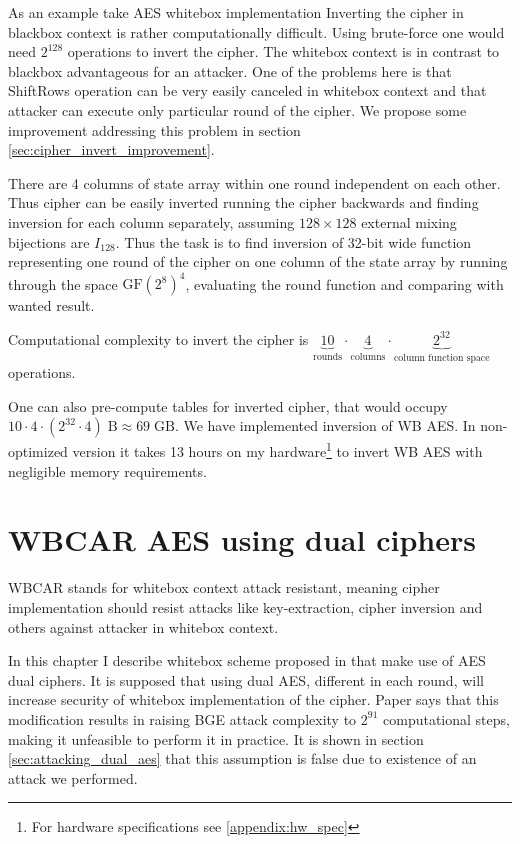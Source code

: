 \documentclass[11pt,oneside,final]{fithesis2}
\begin{document}
    As an example take AES whitebox implementation
    Inverting the cipher in blackbox context is rather computationally difficult. Using brute-force one would
    need $2^{128}$ operations to invert the cipher. The whitebox context is in contrast to blackbox advantageous for an attacker. One of the problems here is 
    that ShiftRows operation can be very easily canceled in whitebox context and that attacker can execute only particular round of the cipher. 
    We propose some improvement addressing this problem in section \ref{sec:cipher_invert_improvement}.

    There are 4 columns of state array within one round independent on each other.
    Thus cipher can be easily inverted running the cipher backwards and finding inversion for each column separately, assuming $128\times128$ external mixing bijections
    are $I_{128}$. Thus the task is to find 
    inversion of 32-bit wide function representing one round of the cipher on one column of the state array by running through the space $\text{GF}\left(2^8\right)^4$,
    evaluating the round function and comparing with wanted result.
    
    Computational complexity to invert the cipher
    is $\underbrace{10}_\text{rounds} \cdot \underbrace{4}_\text{columns} \cdot \underbrace{2^{32}}_\text{column function space}$ operations.
    
    One can also pre-compute tables for inverted cipher, that would occupy $10 \cdot 4 \cdot (2^{32} \cdot 4)\;\text{B} \approx 69\;\text{GB}$.
    We have implemented inversion of WB AES. In non-optimized version it takes 13 hours on my hardware\footnote{For hardware specifications see \ref{appendix:hw_spec}} 
    to invert WB AES with negligible memory requirements.

\chapter{WBCAR AES using dual ciphers}
    WBCAR stands for whitebox context attack resistant, meaning cipher implementation should resist attacks like key-extraction, cipher inversion
    and others against attacker in whitebox context.
    
    In this chapter I describe whitebox scheme proposed in \citep{Karroumi:2010:PWA:2041036.2041060} that make use of AES dual ciphers. It is supposed 
    that using dual AES, different in each round, will increase security of whitebox implementation of the cipher. Paper says that this modification
    results in raising BGE attack \citep{Billet:2004:CWB:2080787.2080809} complexity to $2^{91}$ computational steps, making it unfeasible to perform it in practice. It is shown in section
    \ref{sec:attacking_dual_aes} that this assumption is false due to existence of an attack we performed.
    
\end{document}
